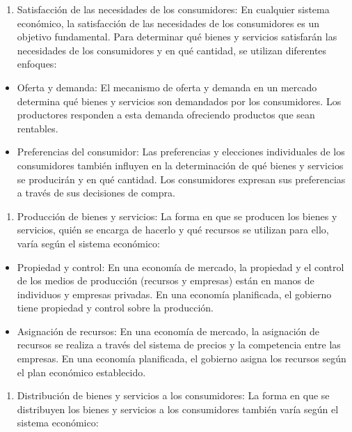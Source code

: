 \documentclass[
  letterpaper,
  DIV=11,
  numbers=noendperiod]{scrartcl}
\providecommand{\tightlist}{%
  \setlength{\itemsep}{0pt}\setlength{\parskip}{0pt}}\usepackage{longtable,booktabs,array}
\begin{document}
\begin{enumerate}
\def\labelenumi{\arabic{enumi}.}
\setcounter{enumi}{1}
\tightlist
\item
  Satisfacción de las necesidades de los consumidores: En cualquier
  sistema económico, la satisfacción de las necesidades de los
  consumidores es un objetivo fundamental. Para determinar qué bienes y
  servicios satisfarán las necesidades de los consumidores y en qué
  cantidad, se utilizan diferentes enfoques:
\end{enumerate}

\begin{itemize}
\item
  Oferta y demanda: El mecanismo de oferta y demanda en un mercado
  determina qué bienes y servicios son demandados por los consumidores.
  Los productores responden a esta demanda ofreciendo productos que sean
  rentables.
\item
  Preferencias del consumidor: Las preferencias y elecciones
  individuales de los consumidores también influyen en la determinación
  de qué bienes y servicios se producirán y en qué cantidad. Los
  consumidores expresan sus preferencias a través de sus decisiones de
  compra.
\end{itemize}

\begin{enumerate}
\def\labelenumi{\arabic{enumi}.}
\setcounter{enumi}{2}
\tightlist
\item
  Producción de bienes y servicios: La forma en que se producen los
  bienes y servicios, quién se encarga de hacerlo y qué recursos se
  utilizan para ello, varía según el sistema económico:
\end{enumerate}

\begin{itemize}
\item
  Propiedad y control: En una economía de mercado, la propiedad y el
  control de los medios de producción (recursos y empresas) están en
  manos de individuos y empresas privadas. En una economía planificada,
  el gobierno tiene propiedad y control sobre la producción.
\item
  Asignación de recursos: En una economía de mercado, la asignación de
  recursos se realiza a través del sistema de precios y la competencia
  entre las empresas. En una economía planificada, el gobierno asigna
  los recursos según el plan económico establecido.
\end{itemize}

\begin{enumerate}
\def\labelenumi{\arabic{enumi}.}
\setcounter{enumi}{3}
\tightlist
\item
  Distribución de bienes y servicios a los consumidores: La forma en que
  se distribuyen los bienes y servicios a los consumidores también varía
  según el sistema económico:
\end{enumerate}
\end{document}
